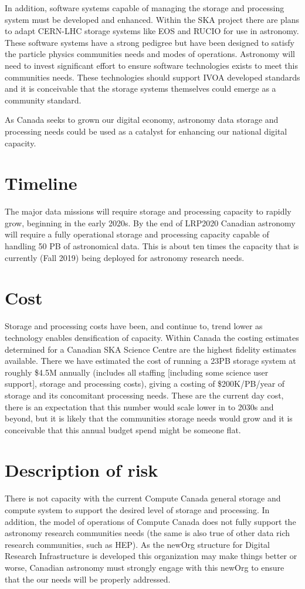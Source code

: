 \documentclass[11pt]{article}
\begin{document}
In addition, software systems capable of managing the storage and processing system must be developed and enhanced.  Within the SKA project there are plans to adapt CERN-LHC storage systems like EOS and RUCIO for use in astronomy.  These software systems have a strong pedigree but have been designed to satisfy the particle physics communities needs and modes of operations.  Astronomy will need to invest significant effort to ensure software technologies exists to meet this communities needs.  These technologies should support IVOA developed standards and it is conceivable that the storage systems themselves could emerge as a community standard. 

As Canada seeks to grown our digital economy, astronomy data storage and processing needs could be used as a catalyst for enhancing our national digital capacity.

\section{Timeline}
The major data missions will require storage and processing capacity to rapidly grow, beginning in the early 2020s.   By the end of LRP2020 Canadian astronomy will require a fully operational storage and processing capacity capable of handling 50 PB of astronomical data. This is about ten times the capacity that is currently (Fall 2019) being deployed for astronomy research needs.

\section{Cost}
Storage and processing costs have been, and continue to, trend lower as technology enables densification of capacity.   Within Canada the costing estimates determined for a Canadian SKA Science Centre are the highest fidelity estimates available.  There we have estimated the cost of running a 23PB storage system at roughly \$4.5M annually (includes all staffing [including some science user support], storage and processing costs), giving a costing of \$200K/PB/year of storage and its concomitant processing needs. These are the current day cost, there is an expectation that this number would scale lower in to 2030s and beyond, but it is likely that the communities storage needs would grow and it is conceivable that this annual budget spend might be someone flat.

\section{Description of risk}
There is not capacity with the current Compute Canada general storage and compute system to support the desired level of storage and processing.  In addition, the model of operations of Compute Canada does not fully support the astronomy research communities needs (the same is also true of other data rich research communities, such as HEP).   As the newOrg structure for Digital Research Infrastructure is developed this organization may make things better or worse, Canadian astronomy must strongly engage with this newOrg to ensure that the our needs will be properly addressed.  
\end{document}
